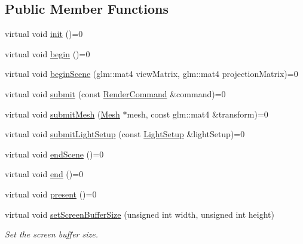 \subsection*{Public Member Functions}
\begin{DoxyCompactItemize}
\item 
virtual void \hyperlink{classce_1_1graphics_1_1_renderer3_d_ae887bbdc74af40838e6d059d30bb430b}{init} ()=0
\item 
virtual void \hyperlink{classce_1_1graphics_1_1_renderer3_d_a51818b5b581c33001ddbbc6dff9d6e36}{begin} ()=0
\item 
virtual void \hyperlink{classce_1_1graphics_1_1_renderer3_d_a308b1b75bf6ac0d73f89ce89840f632a}{begin\+Scene} (glm\+::mat4 view\+Matrix, glm\+::mat4 projection\+Matrix)=0
\item 
virtual void \hyperlink{classce_1_1graphics_1_1_renderer3_d_a67e956930a17600cdcfc689aa624f990}{submit} (const \hyperlink{structce_1_1graphics_1_1_render_command}{Render\+Command} \&command)=0
\item 
virtual void \hyperlink{classce_1_1graphics_1_1_renderer3_d_aba7b0abfa0aad0d89a816923e83ef787}{submit\+Mesh} (\hyperlink{classce_1_1graphics_1_1_mesh}{Mesh} $\ast$mesh, const glm\+::mat4 \&transform)=0
\item 
virtual void \hyperlink{classce_1_1graphics_1_1_renderer3_d_a4a2eb6efe3adbff611c20141159eb3dc}{submit\+Light\+Setup} (const \hyperlink{structce_1_1graphics_1_1_light_setup}{Light\+Setup} \&light\+Setup)=0
\item 
virtual void \hyperlink{classce_1_1graphics_1_1_renderer3_d_a0b8feaf1dd7f6ee03c7be2197d012e25}{end\+Scene} ()=0
\item 
virtual void \hyperlink{classce_1_1graphics_1_1_renderer3_d_a4d35e07f42a4fb42ebe3f8e57bfcdb58}{end} ()=0
\item 
virtual void \hyperlink{classce_1_1graphics_1_1_renderer3_d_a7b258350b5af957550a2d29800d3c5b7}{present} ()=0
\item 
virtual void \hyperlink{classce_1_1graphics_1_1_renderer3_d_a39b5c5b8a62c71600d23de2d642e1546}{set\+Screen\+Buffer\+Size} (unsigned int width, unsigned int height)
\begin{DoxyCompactList}\small\item\em Set the screen buffer size. \end{DoxyCompactList}\end{DoxyCompactItemize}

